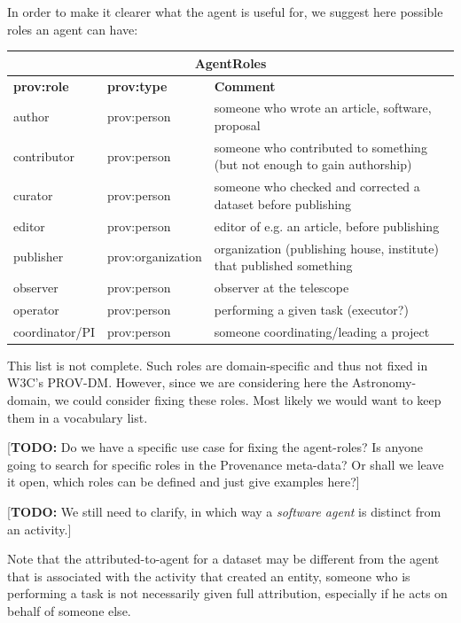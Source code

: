\documentclass[11pt,a4paper]{ivoa}
\newcommand{\TODO}[1]{\noindent \textcolor{todocolor}{[\textbf{TODO:} #1]}}
\begin{document}
In order to make it clearer what the agent is useful for, we suggest here possible roles an agent can have:\\
\begin{center}
\begin{tabular}{l|l|p{}}
\multicolumn{3}{c}{\textbf{AgentRoles}}\\ \hline
\textbf{prov:role} & \textbf{prov:type} & \textbf{Comment} \\ \hline
author & prov:person & someone who wrote an article, software, proposal\\
contributor & prov:person & someone who contributed to something (but not enough to gain authorship)\\
curator & prov:person & someone who checked and corrected a dataset before publishing\\
editor & prov:person & editor of e.g. an article, before publishing\\
publisher & prov:organization & organization (publishing house, institute) that published something\\
observer & prov:person & observer at the telescope\\
operator & prov:person & performing a given task (executor?)\\
coordinator/PI & prov:person & someone coordinating/leading a project\\
\end{tabular}
\end{center}
This list is not complete. Such roles are domain-specific and thus not fixed in W3C's PROV-DM. However, since we are considering here the Astronomy-domain, we could 
consider fixing these roles. Most likely we would want to keep them in a vocabulary list.

\TODO{Do we have a specific use case for fixing the agent-roles? Is anyone going to search for specific roles in the Provenance meta-data?
Or shall we leave it open, which roles can be defined and just give examples here?}

\TODO{We still need to clarify, in which way a \emph{software agent} is distinct from an activity.}

Note that the attributed-to-agent for a dataset may be different from the agent that is associated with the activity that created an entity, someone who is performing a task is not necessarily given full attribution, especially if he acts on behalf of someone else.
\end{document}
